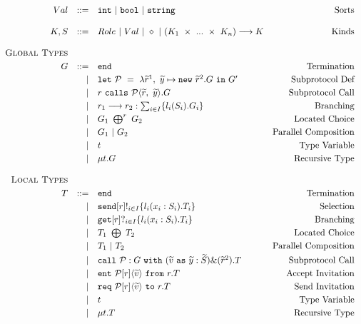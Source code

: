 \documentclass[12pt,twoside]{report}
\begin{document}
\begin{figure}[h]
    \centering
    \begin{equation*}
    \centering
    \begin{array}{rrlr}
        Val & ::= & \texttt{int}\ |\ \texttt{bool}\ |\ \texttt{string} & \text{Sorts}\\\\
        K, S & ::= & Role\ |\ Val\ |\ \diamond\ |\ (K_1\ \times\ ...\ \times\ K_n) \longrightarrow K & \text{Kinds}\\\\
        
        \textsc{Global\ Types} & & &\\[3pt]
        G & ::= & \texttt{end} & \text{Termination}  \\[2.75pt]
             & | & \texttt{let}\ \mathcal{P}\ =\ \lambda\widetilde{r}^1,\ \widetilde{y} \mapsto \texttt{new}\ \widetilde{r}^2.G\ \texttt{in}\ G' & \text{Subprotocol\ Def}\\[2.75pt]
             & | & r\ \texttt{calls}\ \mathcal{P}\langle \widetilde{r},\ \widetilde{y}\rangle.G  & \text{Subprotocol\ Call} \\[2.75pt]
             & | & r_1 \longrightarrow r_2: \sum_{i \in I}\{l_i( S_i).G_i\} &  \text{Branching} \\[2.75pt]
             & | & G_1\ \bigoplus^r\ G_2   & \text{Located Choice} \\[2.75pt]
             & | & G_1\ |\ G_2 & \text{Parallel\ Composition} \\[2.75pt]
             & | & t & \text{Type\ Variable}\\[2.75pt]
             & | & \mu t.G & \text{Recursive\ Type}\\\\
             
        \textsc{Local Types} &&& \\[3pt]
        T & ::= & \texttt{end} &  \text{Termination}  \\[2.75pt]
          & | & \texttt{send}[r]!_{i \in I}\{ l_i(x_i: S_i).T_i\} & \text{Selection} \\[2.75pt]
          & | & \texttt{get}[r]?_{i \in I}\{l_i(x_i:S_i).T_i\} &  \text{Branching} \\[2.75pt] 
          & | & T_1\ \bigoplus \ T_2   & \text{Located Choice} \\[2.75pt]
          & | & T_1\ |\ T_2 & \text{Parallel\ Composition} \\[2.75pt]
          & | & \texttt{call}\ \mathcal{P}:G\ \texttt{with}\ (\widetilde{v}\ \texttt{as}\ \widetilde{y}:\widetilde{S})\&(\widetilde{r}^2).T &  \text{Subprotocol Call} \\[2.75pt]
          & | & \texttt{ent}\ \mathcal{P}[r]\langle \widetilde{v} \rangle\ \texttt{from}\ r.T &  \text{Accept Invitation} \\[2.75pt]
          & | & \texttt{req}\ \mathcal{P}[r]\langle \widetilde{v} \rangle\ \texttt{to}\ r.T &  \text{Send Invitation} \\[2.75pt]
          & | & t &  \text{Type\ Variable} \\[2.75pt]
          & | & \mu t.T &  \text{Recursive\ Type}
        

\end{array}
\end{equation*}
\end{figure}
\end{document}
